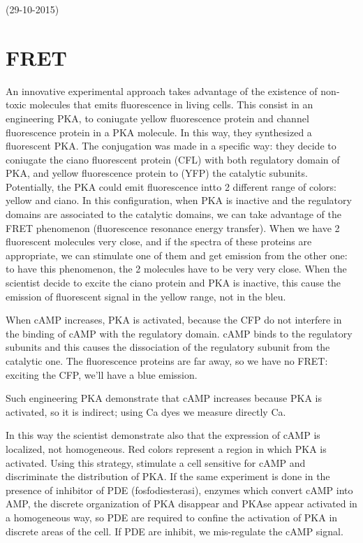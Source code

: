 \documentclass[a4paper, 12pt]{book}
\begin{document}
(29-10-2015)
\section{FRET}
An innovative experimental approach takes advantage of the existence of non-toxic molecules that emits fluorescence in living cells. This consist in an engineering PKA, to coniugate yellow fluorescence protein and channel fluorescence protein in a PKA molecule. In this way, they synthesized a fluorescent PKA. The conjugation was made in a specific way: they decide to coniugate the ciano fluorescent protein (CFL) with both regulatory domain of PKA, and yellow fluorescence protein to (YFP)  the catalytic subunits. Potentially, the PKA could emit fluorescence intto 2 different range of colors: yellow and ciano.  In this configuration, when PKA is inactive and the regulatory domains are associated to the catalytic domains, we can take advantage of the FRET phenomenon (fluorescence resonance energy transfer). When we have 2 fluorescent molecules very close, and if the spectra of these proteins are appropriate, we can stimulate one of them and get emission from the other one: to have this phenomenon, the 2 molecules have to be very very close. When the scientist decide to excite the ciano protein and PKA is inactive, this cause the emission of fluorescent signal in the yellow range, not in the bleu.

When cAMP increases, PKA is activated, because the CFP do not interfere in the binding of cAMP with the regulatory domain. cAMP binds to the regulatory subunits and this causes the dissociation of the regulatory subunit from the catalytic one. The fluorescence proteins are far away, so we have no FRET: exciting the CFP, we'll have a blue emission.

Such engineering PKA demonstrate that cAMP increases because PKA is activated, so it is indirect; using Ca dyes we measure directly Ca.

In this way the scientist demonstrate also that the expression of cAMP is localized, not homogeneous. Red colors represent a region in which PKA is activated. Using this strategy, stimulate a cell sensitive for cAMP and discriminate the distribution of PKA. If the same experiment is done in the presence of inhibitor of PDE (fosfodiesterasi), enzymes which convert cAMP into AMP, the discrete organization of PKA disappear and PKAse appear activated in a homogeneous way, so PDE are required to confine the activation of PKA in discrete areas of the cell. If PDE are inhibit, we mis-regulate the cAMP signal. 
\end{document}
